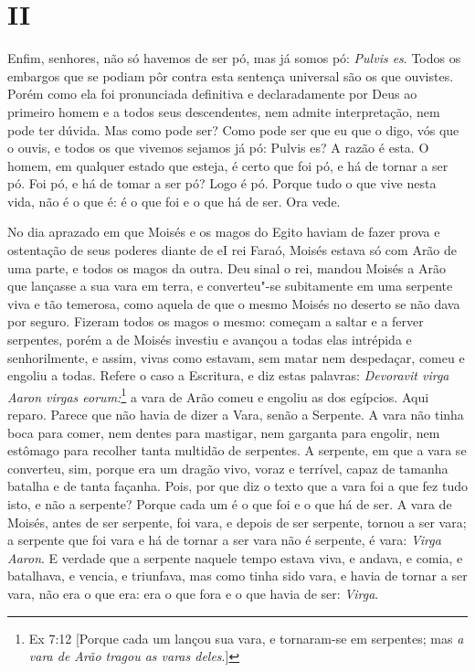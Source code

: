 \section*{II}

Enfim, senhores, não só havemos de ser pó, mas já somos pó: \emph{Pulvis
es}. Todos os embargos que se podiam pôr contra esta sentença universal
são os que ouvistes. Porém como ela foi pronunciada definitiva e
declaradamente por Deus ao primeiro homem e a todos seus descendentes,
nem admite interpretação, nem pode ter dúvida. Mas como pode ser? Como
pode ser que eu que o digo, vós que o ouvis, e todos os que vivemos
sejamos já pó: Pulvis es?
A razão é esta. O homem, em qualquer estado que esteja, é certo que foi
pó, e há de tornar a ser pó. Foi pó, e há de tomar a ser pó? Logo é pó.
Porque tudo o que vive nesta vida, não é o que é: é o que foi e o que há
de ser. Ora vede.

No dia aprazado em que Moisés e os magos do Egito haviam de fazer prova
e ostentação de seus poderes diante de eI rei Faraó, Moisés estava só
com Arão de uma parte, e todos os magos da outra. Deu sinal o rei,
mandou Moisés a Arão que lançasse a sua vara em terra, e converteu"-se
subitamente em uma serpente viva e tão temerosa, como aquela de que o
mesmo Moisés no deserto se não dava por seguro. Fizeram todos os magos o
mesmo: começam a saltar e a ferver serpentes, porém a de Moisés investiu
e avançou a todas elas intrépida e senhorilmente, e assim, vivas como
estavam, sem matar nem despedaçar, comeu e engoliu a todas. Refere o
caso a Escritura, e diz estas palavras: \emph{Devoravit virga Aaron
virgas eorum:}\footnote{Ex 7:12 [Porque cada um lançou sua vara, e tornaram-se em serpentes; mas \emph{a vara de Arão tragou as varas deles}.]} a vara de Arão comeu e engoliu as dos egípcios. Aqui reparo.
Parece que não havia de dizer a Vara, senão a Serpente. A vara
não tinha boca para comer, nem dentes para mastigar, nem garganta para
engolir, nem estômago para recolher tanta multidão de serpentes. A
serpente, em que a vara se converteu, sim, porque era um dragão vivo,
voraz e terrível, capaz de tamanha batalha e de tanta façanha. Pois, por
que diz o texto que a vara foi a que fez tudo isto, e não a serpente?
Porque cada um é o que foi e o que há de ser. A vara de Moisés, antes de
ser serpente, foi vara, e depois de ser serpente, tornou a ser vara; a
serpente que foi vara e há de tornar a ser vara não é serpente, é vara:
\emph{Virga Aaron}. E verdade que a serpente naquele tempo estava viva,
e andava, e comia, e batalhava, e vencia, e triunfava, mas como tinha
sido vara, e havia de tornar a ser vara, não era o que era: era o que
fora e o que havia de ser: \emph{Virga}.

